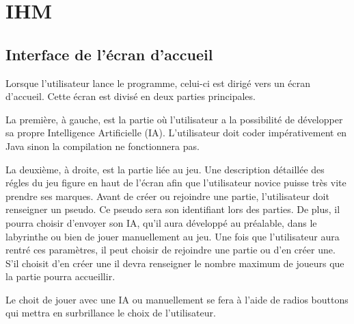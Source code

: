 \chapter{IHM}


\section{Interface de l'écran d'accueil}

Lorsque l'utilisateur lance le programme, celui-ci est dirigé vers un écran d'accueil. Cette écran est divisé en deux parties principales.

La première, à gauche, est la partie où l'utilisateur a la possibilité de développer sa propre Intelligence Artificielle (IA). L'utilisateur doit coder impérativement en Java sinon la compilation ne fonctionnera pas. 

La deuxième, à droite, est la partie liée au jeu. Une description détaillée des régles du jeu figure en haut de l'écran afin que l'utilisateur novice puisse très vite prendre ses marques. Avant de créer ou rejoindre une partie, l'utilisateur doit renseigner un pseudo. Ce pseudo sera son identifiant lors des parties. De plus, il pourra choisir d'envoyer son IA, qu'il aura développé au préalable, dans le labyrinthe ou bien de jouer manuellement au jeu. Une fois que l'utilisateur aura rentré ces paramètres, il peut choisir de rejoindre une partie ou d'en créer une. S'il choisit d'en créer une il devra renseigner le nombre maximum de joueurs que la partie pourra accueillir. 

Le choit de jouer avec une IA ou manuellement se fera à l'aide de radios bouttons qui mettra en surbrillance le choix de l'utilisateur. 

